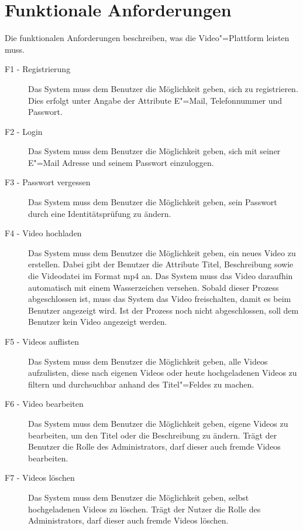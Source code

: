 \section{Funktionale Anforderungen}

Die funktionalen Anforderungen beschreiben, was die Video"=Plattform leisten muss.

\begin{description}
   \item[F1 - Registrierung] Das System muss dem Benutzer die Möglichkeit geben, sich zu registrieren. Dies erfolgt unter Angabe der Attribute E"=Mail, Telefonnummer und Passwort. \label{F1}
   \item[F2 - Login] Das System muss dem Benutzer die Möglichkeit geben, sich mit seiner E"=Mail Adresse und seinem Passwort einzuloggen. \label{F2}
   \item[F3 - Passwort vergessen] Das System muss dem Benutzer die Möglichkeit geben, sein Passwort durch eine Identitätsprüfung zu ändern. \label{F3}
   \item[F4 - Video hochladen] Das System muss dem Benutzer die Möglichkeit geben, ein neues Video zu erstellen. Dabei gibt der Benutzer die Attribute Titel, Beschreibung sowie die Videodatei im Format mp4 an. Das System muss das Video daraufhin automatisch mit einem Wasserzeichen versehen. Sobald dieser Prozess abgeschlossen ist, muss das System das Video freischalten, damit es beim Benutzer angezeigt wird. Ist der Prozess noch nicht abgeschlossen, soll dem Benutzer kein Video angezeigt werden. \label{F4}
   \item[F5 - Videos auflisten] Das System muss dem Benutzer die Möglichkeit geben, alle Videos aufzulisten, diese nach eigenen Videos oder heute hochgeladenen Videos zu filtern und durchsuchbar anhand des Titel"=Feldes zu machen. \label{F5}
   \item[F6 - Video bearbeiten] Das System muss dem Benutzer die Möglichkeit geben, eigene Videos zu bearbeiten, um den Titel oder die Beschreibung zu ändern. Trägt der Benutzer die Rolle des Administrators, darf dieser auch fremde Videos bearbeiten. \label{F6}
   \item[F7 - Videos löschen] Das System muss dem Benutzer die Möglichkeit geben, selbst hochgeladenen Videos zu löschen. Trägt der Nutzer die Rolle des Administrators, darf dieser auch fremde Videos löschen. \label{F7}
\end{description}